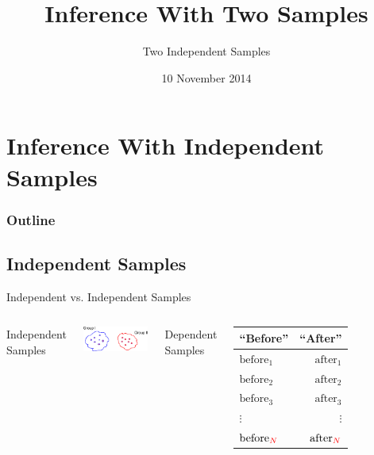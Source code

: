 
\section{Inference With Independent Samples}

\title{Inference With Two Samples}
\subtitle{Two Independent Samples}

\date{10 November 2014}

\begin{frame}
  \titlepage
\end{frame}

\begin{frame}
  \frametitle{Outline}
  \tableofcontents[hideothersubsections,sectionstyle=show/hide]
\end{frame}



\subsection{Independent Samples}

\begin{frame}{Independent vs. Independent Samples}

  \begin{columns}[T]
    Independent Samples

    \includegraphics[width=5cm]{img/independentSamples}

    \vfill

    Dependent Samples

    \begin{tabular}{l@{$\Rightarrow$}r}
      ``Before'' & ``After'' \\ \hline
      $\textrm{before}_1$  & $\textrm{after}_1$ \\
      $\textrm{before}_2$  & $\textrm{after}_2$ \\
      $\textrm{before}_3$  & $\textrm{after}_3$ \\
      $\vdots$ & $\vdots$ \\
      $\textrm{before}_{{\color{red}N}}$ & $\textrm{after}_{{\color{red}N}}$  \\
    \end{tabular}


    \vfill

  \end{columns}

  
\end{frame}


